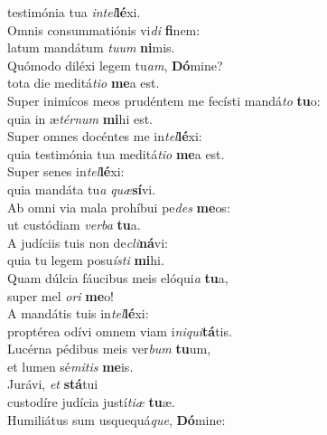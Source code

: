\oddverse testimónia tua \textit{in}\textit{tel}\textbf{lé}xi.\\
\evenverse Omnis consummatiónis vi\textit{di} \textbf{fi}nem:~\*\\
\evenverse latum mandátum \textit{tu}\textit{um} \textbf{ni}mis.\\
\oddverse Quómodo diléxi legem tu\textit{am}, \textbf{Dó}mine?~\*\\
\oddverse tota die meditá\textit{ti}\textit{o} \textbf{me}a est.\\
\evenverse Super inimícos meos prudéntem me fecísti mandá\textit{to} \textbf{tu}o:~\*\\
\evenverse quia in æ\textit{tér}\textit{num} \textbf{mi}hi est.\\
\oddverse Super omnes docéntes me in\textit{tel}\textbf{lé}xi:~\*\\
\oddverse quia testimónia tua meditá\textit{ti}\textit{o} \textbf{me}a est.\\
\evenverse Super senes in\textit{tel}\textbf{lé}xi:~\*\\
\evenverse quia mandáta tu\textit{a} \textit{quæ}\textbf{sí}vi.\\
\oddverse Ab omni via mala prohíbui pe\textit{des} \textbf{me}os:~\*\\
\oddverse ut custódiam \textit{ver}\textit{ba} \textbf{tu}a.\\
\evenverse A judíciis tuis non de\textit{cli}\textbf{ná}vi:~\*\\
\evenverse quia tu legem posu\textit{í}\textit{sti} \textbf{mi}hi.\\
\oddverse Quam dúlcia fáucibus meis elóqui\textit{a} \textbf{tu}a,~\*\\
\oddverse super mel \textit{o}\textit{ri} \textbf{me}o!\\
\evenverse A mandátis tuis in\textit{tel}\textbf{lé}xi:~\*\\
\evenverse proptérea odívi omnem viam i\textit{ni}\textit{qui}\textbf{tá}tis.\\
\oddverse Lucérna pédibus meis ver\textit{bum} \textbf{tu}um,~\*\\
\oddverse et lumen sé\textit{mi}\textit{tis} \textbf{me}is.\\
\evenverse Jurávi, \textit{et} \textbf{stá}tui~\*\\
\evenverse custodíre judícia justí\textit{ti}\textit{æ} \textbf{tu}æ.\\
\oddverse Humiliátus sum usquequá\textit{que}, \textbf{Dó}mine:~\*\\
